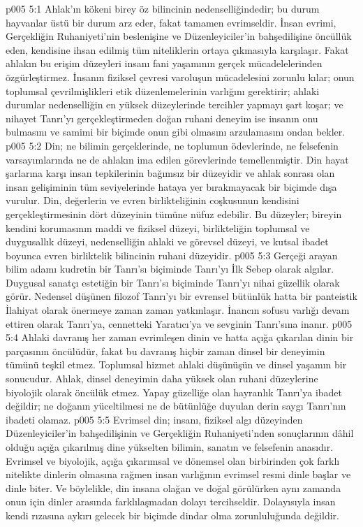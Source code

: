 \vs p005 5:1 Ahlak’ın kökeni birey öz bilincinin nedenselliğindedir; bu durum hayvanlar üstü bir durum arz eder, fakat tamamen evrimseldir. İnsan evrimi, Gerçekliğin Ruhaniyeti’nin beslenişine ve Düzenleyiciler’in bahşedilişine öncüllük eden, kendisine ihsan edilmiş tüm niteliklerin ortaya çıkmasıyla karşılaşır. Fakat ahlakın bu erişim düzeyleri insanı fani yaşamının gerçek mücadelelerinden özgürleştirmez. İnsanın fiziksel çevresi varoluşun mücadelesini zorunlu kılar; onun toplumsal çevrilmişlikleri etik düzenlemelerinin varlığını gerektirir; ahlaki durumlar nedenselliğin en yüksek düzeylerinde tercihler yapmayı şart koşar; ve nihayet Tanrı’yı gerçekleştirmeden doğan ruhani deneyim ise insanın onu bulmasını ve samimi bir biçimde onun gibi olmasını arzulamasını ondan bekler.
\vs p005 5:2 Din; ne bilimin gerçeklerinde, ne toplumun ödevlerinde, ne felsefenin varsayımlarında ne de ahlakın ima edilen görevlerinde temellenmiştir. Din hayat şarlarına karşı insan tepkilerinin bağımsız bir düzeyidir ve ahlak sonrası olan insan gelişiminin tüm seviyelerinde hataya yer bırakmayacak bir biçimde dışa vurulur. Din, değerlerin ve evren birlikteliğinin coşkusunun kendisini gerçekleştirmesinin dört düzeyinin tümüne nüfuz edebilir. Bu düzeyler; bireyin kendini korumasının maddi ve fiziksel düzeyi, birlikteliğin toplumsal ve duygusallık düzeyi, nedenselliğin ahlaki ve görevsel düzeyi, ve kutsal ibadet boyunca evren birliktelik bilincinin ruhani düzeyidir.
\vs p005 5:3 Gerçeği arayan bilim adamı kudretin bir Tanrı’sı biçiminde Tanrı’yı İlk Sebep olarak algılar. Duygusal sanatçı estetiğin bir Tanrı’sı biçiminde Tanrı’yı nihai güzellik olarak görür. Nedensel düşünen filozof Tanrı’yı bir evrensel bütünlük hatta bir panteistik İlahiyat olarak önermeye zaman zaman yatkınlaşır. İnancın sofusu varlığı devam ettiren olarak Tanrı’ya, cennetteki Yaratıcı’ya ve sevginin Tanrı’sına inanır.
\vs p005 5:4 Ahlaki davranış her zaman evrimleşen dinin ve hatta açığa çıkarılan dinin bir parçasının öncülüdür, fakat bu davranış hiçbir zaman dinsel bir deneyimin tümünü teşkil etmez. Toplumsal hizmet ahlaki düşünüşün ve dinsel yaşamın bir sonucudur. Ahlak, dinsel deneyimin daha yüksek olan ruhani düzeylerine biyolojik olarak öncülük etmez. Yapay güzelliğe olan hayranlık Tanrı’ya ibadet değildir; ne doğanın yüceltilmesi ne de bütünlüğe duyulan derin saygı Tanrı’nın ibadeti olamaz.
\vs p005 5:5 Evrimsel din; insanı, fiziksel algı düzeyinden Düzenleyiciler’in bahşedilişinin ve Gerçekliğin Ruhaniyeti’nden sonuçlarının dâhil olduğu açığa çıkarılmış dine yükselten bilimin, sanatın ve felsefenin anasıdır. Evrimsel ve biyolojik, açığa çıkarımsal ve dönemsel olan birbirinden çok farklı nitelikte dinlerin olmasına rağmen insan varlığının evrimsel resmi dinle başlar ve dinle biter. Ve böylelikle, din insana olağan ve doğal görülürken aynı zamanda onun için dinler arasında farklılaşmadan dolayı tercihseldir. Dolayısıyla insan kendi rızasına aykırı gelecek bir biçimde dindar olma zorunluluğunda değildir.
